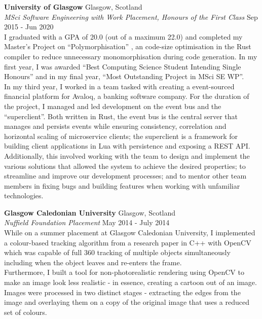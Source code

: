 \documentclass[a4paper]{article}
\begin{document}
\textbf{University of Glasgow} \hfill {\color{gray} Glasgow, Scotland} \\
\textit{MSci Software Engineering with Work Placement, Honours of the First Class} \hfill {\color{gray} Sep 2015 - Jun 2020} \\
\vspace{2mm}
I graduated with a GPA of 20.0 (out of a maximum 22.0) and completed my Master's Project on
``Polymorphisation'' \footnotemark[1], an code-size optimisation in the Rust compiler to reduce
unnecessary monomorphisation during code generation. In my first year, I was awarded ``Best
Computing Science Student Intending Single Honours'' and in my final year, ``Most Outstanding
Project in MSci SE WP''. \\
\vspace{2mm}
In my third year, I worked in a team tasked with creating a event-sourced financial platform
\footnotemark[2] \footnotemark[3] for Avaloq, a banking software company. For the duration of the
project, I managed and led development on the event bus and the ``superclient''. Both written in
Rust, the event bus is the central server that manages and persists events while ensuring
consistency, correlation and horizontal scaling of microservice clients; the superclient is a
framework for building client applications in Lua with persistence and exposing a REST API. \\
\vspace{2mm}
Additionally, this involved working with the team to design and implement the various solutions that
allowed the system to achieve the desired properties; to streamline and improve our development
processes; and to mentor other team members in fixing bugs and building features when working with
unfamiliar technologies.
\vspace{2mm}

\textbf{Glasgow Caledonian University} \hfill {\color{gray} Glasgow, Scotland} \\
\textit{Nuffield Foundation Placement} \hfill {\color{gray} May 2014 - July 2014} \\
\vspace{2mm}
While on a summer placement at Glasgow Caledonian University, I implemented a colour-based
tracking algorithm from a research paper in C++ with OpenCV \footnotemark[4] \footnotemark[5] which
was capable of full 360 tracking of multiple objects simultaneously including when the object
leaves and re-enters the frame. \\
\vspace{2mm}
Furthermore, I built a tool for non-photorealistic rendering using OpenCV to make an image look
less realistic - in essence, creating a cartoon out of an image. Images were processed in two
distinct stages - extracting the edges from the image and overlaying them on a copy of the
original image that uses a reduced set of colours.
\vspace{2mm}
\end{document}

